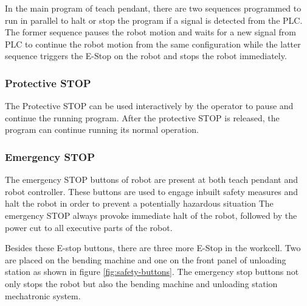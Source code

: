 In the main program of teach pendant, there are two sequences programmed to run in parallel to halt or stop the program if a signal is detected
from the PLC. The former sequence pauses the robot motion and waits for a new signal from PLC to continue the robot motion from the same configuration while the latter sequence triggers the E-Stop on the robot and stops the robot immediately. 



\subsubsection{Protective STOP}
The Protective STOP can be used interactively by the operator to pause and continue the running program.
After the protective STOP is released, the program can continue running its normal operation.

\subsubsection{Emergency STOP}
The emergency STOP buttons of robot are present at both teach pendant and robot controller. These buttons are used to engage inbuilt safety measures and halt the robot in order to
prevent a potentially hazardous situation
The emergency STOP always provoke immediate halt of the robot, followed by the power cut to all
executive parts of the robot.

Besides these E-stop buttons, there are three more E-Stop in the workcell. Two are placed on the bending machine and one on the front panel of unloading station as shown in figure \ref{fig:safety-buttons}. The emergency stop buttons not only stops the robot but also the bending machine and unloading station mechatronic system.


\vspace{1\baselineskip}
